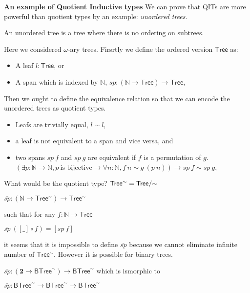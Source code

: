 \textbf{An example of Quotient Inductive types}
We can prove that QITs are more powerful than quotient types by an
example: \emph{unordered trees}. 

\begin{definition}
An unordered tree is a tree where there is no ordering on subtrees.
\end{definition}

Here we considered $\omega$-ary trees. Firsrtly we define the ordered version $\mathsf{Tree}$ as:

\begin{itemize}
\item A leaf $l: \mathsf{Tree}$, or
\item A span which is indexed by $\mathbb{N}$, $sp : (\mathbb{N} \rightarrow \mathsf{Tree}) \rightarrow \mathsf{Tree}$,
\end{itemize}

Then we ought to define the equivalence relation so that we can encode
the unordered trees as quotient types.

\begin{itemize}
\item Leafs are trivially equal, $l \sim l$,
\item a leaf is not equivalent to a span and vice versa, and
\item two spans $sp~f$ and $sp~g$ are equivalent if $f$ is a
  permutation of $g$.
 $(\exists p: \mathbb{N} \rightarrow \mathbb{N}, p~\text{is bijective} \rightarrow
\forall n: \mathbb{N},  f~n \sim g~(p~n)) \rightarrow sp~f \sim sp~g$,
\end{itemize}

What would be the quotient type? $ \mathsf{Tree^{\sim}} =
\qset{\mathsf{Tree}}$ 

$\overline{sp} : (\mathbb{N} \rightarrow \mathsf{Tree^{\sim}}) \rightarrow \mathsf{Tree^{\sim}}$

such that for any $f : \mathbb{N} \rightarrow \mathsf{Tree}$

$\overline{sp}~ ([\_] \circ f) = [ sp~f ] $

it seems that it is impossible to define $\overline{sp}$ because we
cannot eliminate infinite number of $\mathsf{Tree^{\sim}}$.
However it is possible for binary trees.

$\overline{sp} : (\textbf{2} \rightarrow \mathsf{BTree}^{\sim}) \rightarrow
\mathsf{BTree}^{\sim}$ which is ismorphic to

$\overline{sp} : \mathsf{BTree}^{\sim} \rightarrow \mathsf{BTree}^{\sim} \rightarrow \mathsf{BTree}^{\sim}$

